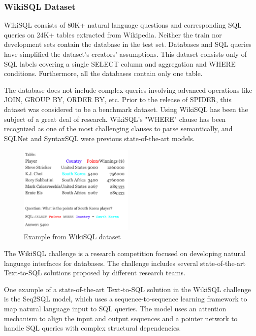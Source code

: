 \subsubsection{WikiSQL Dataset}

WikiSQL consists of 80K+ natural language questions and corresponding SQL queries on 24K+ tables extracted from Wikipedia. Neither the train nor development sets contain the database in the test set. Databases and SQL queries have simplified the dataset's creators' assumptions. This dataset consists only of SQL labels covering a single SELECT column and aggregation and WHERE conditions. Furthermore, all the databases contain only one table.

The database does not include complex queries involving advanced operations like JOIN, GROUP BY, ORDER BY, etc. Prior to the release of SPIDER, this dataset was considered to be a benchmark dataset. Using WikiSQL has been the subject of a great deal of research. WikiSQL's "WHERE" clause has been recognized as one of the most challenging clauses to parse semantically, and SQLNet and SyntaxSQL were previous state-of-the-art models.


\begin{figure}[htb]
    \centering
    \includegraphics[width=0.5\textwidth]{pics/db/WikiSQL.png}
    \caption{Example from WikiSQL dataset\cite{DBLP:journals/corr/abs-1902-01069}}
    \label{fig:WikiSQL}
\end{figure}

The WikiSQL challenge is a research competition focused on developing natural language interfaces for databases. The challenge includes several state-of-the-art Text-to-SQL solutions proposed by different research teams.

One example of a state-of-the-art Text-to-SQL solution in the WikiSQL challenge is the Seq2SQL model, which uses a sequence-to-sequence learning framework to map natural language input to SQL queries. The model uses an attention mechanism to align the input and output sequences and a pointer network to handle SQL queries with complex structural dependencies.

